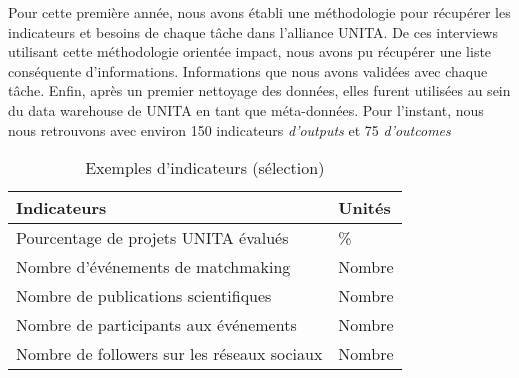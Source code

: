 Pour cette première année, nous avons établi une méthodologie pour récupérer les indicateurs et besoins de chaque tâche dans l'alliance UNITA. De ces interviews utilisant cette méthodologie orientée impact, nous avons pu récupérer une liste conséquente d'informations. Informations que nous avons validées avec chaque tâche. Enfin, après un premier nettoyage des données, elles furent utilisées au sein du data warehouse de UNITA en tant que méta-données. Pour l'instant, nous nous retrouvons avec environ 150 indicateurs \textit{d'outputs} et 75 \textit{d'outcomes}

\begin{table}[h] \caption{Exemples d'indicateurs (sélection)} \begin{center} \begin{tabular}{|l|l|} \hline \textbf{Indicateurs} & \textbf{Unités} \\ \hline Pourcentage de projets UNITA évalués & \% \\ \hline Nombre d'événements de matchmaking & Nombre \\ \hline Nombre de publications scientifiques & Nombre \\ \hline Nombre de participants aux événements & Nombre \\ \hline Nombre de followers sur les réseaux sociaux & Nombre \\ \hline \end{tabular} \end{center} \end{table}

\vspace{-16px}